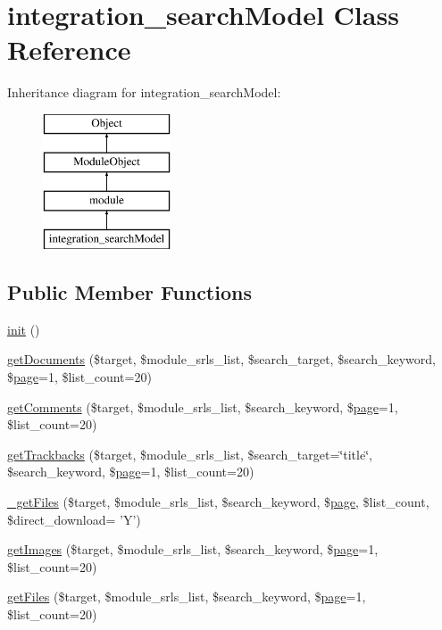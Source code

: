 \hypertarget{classintegration__searchModel}{\section{integration\+\_\+search\+Model Class Reference}
\label{classintegration__searchModel}
}
Inheritance diagram for integration\+\_\+search\+Model\+:\begin{figure}[H]
\begin{center}
\leavevmode
\includegraphics[height=4.000000cm]{classintegration__searchModel}
\end{center}
\end{figure}
\subsection*{Public Member Functions}
\begin{DoxyCompactItemize}
\item 
\hyperlink{classintegration__searchModel_a77ba2cc52ea9843a6812274785a9393f}{init} ()
\item 
\hyperlink{classintegration__searchModel_ac5879957a3ab4f84fb0d6341ca109d8b}{get\+Documents} (\$target, \$module\+\_\+srls\+\_\+list, \$search\+\_\+target, \$search\+\_\+keyword, \$\hyperlink{classpage}{page}=1, \$list\+\_\+count=20)
\item 
\hyperlink{classintegration__searchModel_a4c3399ca8e295b6f427df69e5b417343}{get\+Comments} (\$target, \$module\+\_\+srls\+\_\+list, \$search\+\_\+keyword, \$\hyperlink{classpage}{page}=1, \$list\+\_\+count=20)
\item 
\hyperlink{classintegration__searchModel_a2426cde11df714af3ff96d83366f9752}{get\+Trackbacks} (\$target, \$module\+\_\+srls\+\_\+list, \$search\+\_\+target=\char`\"{}title\char`\"{}, \$search\+\_\+keyword, \$\hyperlink{classpage}{page}=1, \$list\+\_\+count=20)
\item 
\hyperlink{classintegration__searchModel_a880b8ccc0978216ae3d8da0e361b4764}{\+\_\+get\+Files} (\$target, \$module\+\_\+srls\+\_\+list, \$search\+\_\+keyword, \$\hyperlink{classpage}{page}, \$list\+\_\+count, \$direct\+\_\+download= 'Y')
\item 
\hyperlink{classintegration__searchModel_ad46ab3c6bb406037c82feeb554a89b05}{get\+Images} (\$target, \$module\+\_\+srls\+\_\+list, \$search\+\_\+keyword, \$\hyperlink{classpage}{page}=1, \$list\+\_\+count=20)
\item 
\hyperlink{classintegration__searchModel_ad2aca662d598b44aa69c228f2b588a61}{get\+Files} (\$target, \$module\+\_\+srls\+\_\+list, \$search\+\_\+keyword, \$\hyperlink{classpage}{page}=1, \$list\+\_\+count=20)
\end{DoxyCompactItemize}
